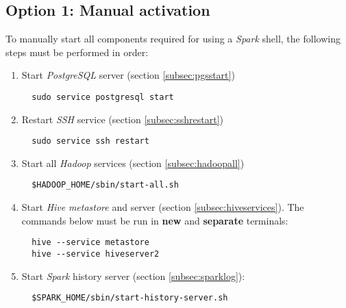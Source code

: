 \documentclass{article}
\begin{document}
  \subsection{Option 1: Manual activation}
  To manually start all components required for using a \emph{Spark} shell, the following steps
  must be performed in order:
  \begin{enumerate}
  \item Start \emph{PostgreSQL} server (section \ref{subsec:pgsstart})
  \begin{verbatim}
  sudo service postgresql start
  \end{verbatim}

  \item Restart \emph{SSH} service (section \ref{subsec:sshrestart})
  \begin{verbatim}
  sudo service ssh restart
  \end{verbatim}

  \item Start all \emph{Hadoop} services (section \ref{subsec:hadoopall})
  \begin{verbatim}
  $HADOOP_HOME/sbin/start-all.sh
  \end{verbatim}

  \item Start \emph{Hive} \emph{metastore} and server (section \ref{subsec:hiveservices}).
  The commands below must be run in \textbf{new} and \textbf{separate} terminals:
  \begin{verbatim}
  hive --service metastore
  hive --service hiveserver2
  \end{verbatim}

  \item Start \emph{Spark} history server (section \ref{subsec:sparklog}):
  \begin{verbatim}
  $SPARK_HOME/sbin/start-history-server.sh
  \end{verbatim}
  \end{enumerate}
\end{document}
